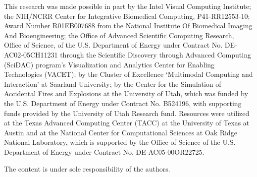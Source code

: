 This research was made possible in part by the Intel Visual
Computing Institute; the NIH/NCRR Center for Integrative Biomedical
Computing, P41-RR12553-10; Award Number R01EB007688 from the National
Institute Of Biomedical Imaging And Bioengineering; the Office of
Advanced Scientific Computing Research, Office of Science, of the
U.S. Department of Energy under Contract No. DE-AC02-05CH11231
through the Scientific Discovery through Advanced Computing (SciDAC)
program's Visualization and Analytics Center for Enabling Technologies
(VACET); by the Cluster of Excellence `Multimodal Computing and
Interaction' at Saarland University; by the Center for the Simulation
of Accidental Fires and Explosions at the University of Utah, which was
funded by the U.S. Department of Energy under Contract No. B524196,
with supporting funds provided by the University of Utah Research
fund. Resources were utilized at the Texas Advanced Computing Center
(TACC) at the University of Texas at Austin and at the National Center
for Computational Sciences at Oak Ridge National Laboratory, which is
supported by the Office of Science of the U.S. Department of Energy
under Contract No. DE-AC05-00OR22725.

The content is under sole responsibility of the authors.
